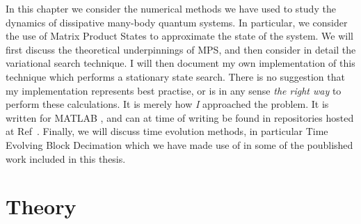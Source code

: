 In this chapter we consider the numerical methods we have used to study the dynamics of dissipative many-body quantum systems. In particular, we consider the use of Matrix Product States to approximate the state of the system. We will first discuss the theoretical underpinnings of MPS, and then consider in detail the variational search technique. I will then document my own implementation of this technique which performs a stationary state search. There is no suggestion that my implementation represents best practise, or is in any sense \emph{the right way} to perform these calculations. It is merely how \emph{I} approached the problem. It is written for MATLAB \cite{MATLAB}, and can at time of writing be found in repositories hosted at Ref~\cite{otb:githome}. Finally, we will discuss time evolution methods, in particular Time Evolving Block Decimation which we have made use of in some of the poublished work included in this thesis. 
 
 \section{Theory}
